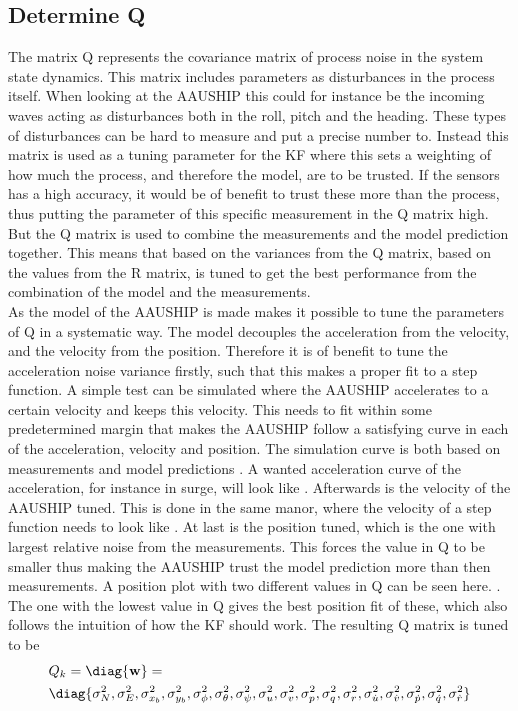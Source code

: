 \subsection{Determine Q}
The matrix Q represents the covariance matrix of process noise in the system state dynamics. This matrix includes parameters as disturbances in the process itself. When looking at the AAUSHIP this could for instance be the incoming waves acting as disturbances both in the roll, pitch and the heading. These types of disturbances can be hard to measure and put a precise number to. Instead this matrix is used as a tuning parameter for the \ac{KF} where this sets a weighting of how much the process, and therefore the model, are to be trusted. If the sensors has a high accuracy, it would be of benefit to trust these more than the process, thus putting the parameter of this specific measurement in the Q matrix high. But the Q matrix is used to combine the measurements and the model prediction together. This means that based on the variances from the Q matrix, based on the values from the R matrix, is tuned to get the best performance from the combination of the model and the measurements.\\
As the model of the AAUSHIP is made makes it possible to tune the parameters of Q in a systematic way. The model decouples the acceleration from the velocity, and the velocity from the position. Therefore it is of benefit to tune the acceleration noise variance firstly, such that this makes a proper fit to a step function. A simple test can be simulated where the AAUSHIP accelerates to a certain velocity and keeps this velocity. This needs to fit within some predetermined margin that makes the AAUSHIP follow a satisfying curve in each of the acceleration, velocity and position. The simulation curve is both based on measurements and model predictions . A wanted acceleration curve of the acceleration, for instance in surge, will look like . Afterwards is the velocity of the AAUSHIP tuned. This is done in the same manor, where the velocity of a step function needs to look like . At last is the position tuned, which is the one with largest relative noise from the measurements. This forces the value in Q to be smaller thus making the AAUSHIP trust the model prediction more than then measurements. A position plot with two different values in Q can be seen here. . The one with the lowest value in Q gives the best position fit of these, which also follows the intuition of how the \ac{KF} should work. The resulting Q matrix is tuned to be
\begin{align}
&Q_k = \diag{\mathbf{w}} = \\ \nonumber
&\diag{\sigma_{N}^2, \sigma_{E}^2, \sigma_{x_{b}}^2, \sigma_{y_{b}}^2, \sigma_{\phi}^2, \sigma_{\theta}^2, \sigma_{\psi}^2, \sigma_{u}^2, \sigma_{v}^2, \sigma_{p}^2, \sigma_{q}^2, \sigma_{r}^2, \sigma_{\dot u}^2, \sigma_{\dot v}^2, \sigma_{\dot p}^2, \sigma_{\dot q}^2, \sigma_{\dot r}^2}
\end{align}


